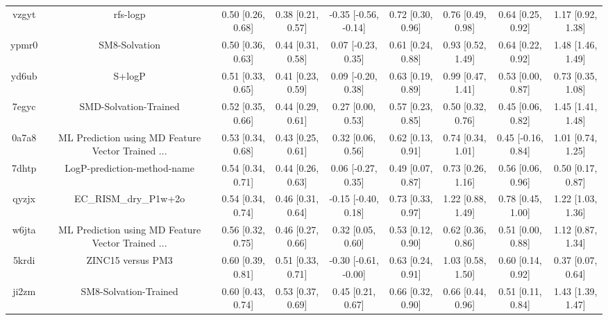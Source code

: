 \documentclass{article}
\begin{document}
\begin{center}
\begin{longtable}{|ccccccccc|}
 vzgyt &                                           rfs-logp &  0.50 [0.26, 0.68] &  0.38 [0.21, 0.57] &  -0.35 [-0.56, -0.14] &  0.72 [0.30, 0.96] &    0.76 [0.49, 0.98] &    0.64 [0.25, 0.92] &     1.17 [0.92, 1.38] \\
 ypmr0 &                                      SM8-Solvation &  0.50 [0.36, 0.63] &  0.44 [0.31, 0.58] &    0.07 [-0.23, 0.35] &  0.61 [0.24, 0.88] &    0.93 [0.52, 1.49] &    0.64 [0.22, 0.92] &     1.48 [1.46, 1.49] \\
 yd6ub &                                             S+logP &  0.51 [0.33, 0.65] &  0.41 [0.23, 0.59] &    0.09 [-0.20, 0.38] &  0.63 [0.19, 0.89] &    0.99 [0.47, 1.41] &    0.53 [0.00, 0.87] &     0.73 [0.35, 1.08] \\
 7egyc &                              SMD-Solvation-Trained &  0.52 [0.35, 0.66] &  0.44 [0.29, 0.61] &     0.27 [0.00, 0.53] &  0.57 [0.23, 0.85] &    0.50 [0.32, 0.76] &    0.45 [0.06, 0.82] &     1.45 [1.41, 1.48] \\
 0a7a8 &  ML Prediction using MD Feature Vector Trained ... &  0.53 [0.34, 0.68] &  0.43 [0.25, 0.61] &     0.32 [0.06, 0.56] &  0.62 [0.13, 0.91] &    0.74 [0.34, 1.01] &   0.45 [-0.16, 0.84] &     1.01 [0.74, 1.25] \\
 7dhtp &                        LogP-prediction-method-name &  0.54 [0.34, 0.71] &  0.44 [0.26, 0.63] &    0.06 [-0.27, 0.35] &  0.49 [0.07, 0.87] &    0.73 [0.26, 1.16] &    0.56 [0.06, 0.96] &     0.50 [0.17, 0.87] \\
 qyzjx &                              EC\_RISM\_dry\_P1w+2o &  0.54 [0.34, 0.74] &  0.46 [0.31, 0.64] &   -0.15 [-0.40, 0.18] &  0.73 [0.33, 0.97] &    1.22 [0.88, 1.49] &    0.78 [0.45, 1.00] &     1.22 [1.03, 1.36] \\
 w6jta &  ML Prediction using MD Feature Vector Trained ... &  0.56 [0.32, 0.75] &  0.46 [0.27, 0.66] &     0.32 [0.05, 0.60] &  0.53 [0.12, 0.90] &    0.62 [0.36, 0.86] &    0.51 [0.00, 0.88] &     1.12 [0.87, 1.34] \\
 5krdi &                                  ZINC15 versus PM3 &  0.60 [0.39, 0.81] &  0.51 [0.33, 0.71] &  -0.30 [-0.61, -0.00] &  0.63 [0.24, 0.91] &    1.03 [0.58, 1.50] &    0.60 [0.14, 0.92] &     0.37 [0.07, 0.64] \\
 ji2zm &                              SM8-Solvation-Trained &  0.60 [0.43, 0.74] &  0.53 [0.37, 0.69] &     0.45 [0.21, 0.67] &  0.66 [0.32, 0.90] &    0.66 [0.44, 0.96] &    0.51 [0.11, 0.84] &     1.43 [1.39, 1.47] \\

\end{longtable}
\end{center}
\end{document}
